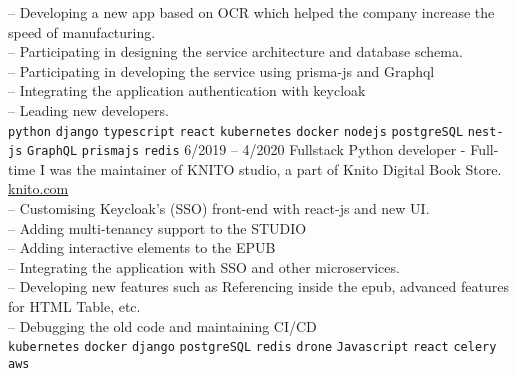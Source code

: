 \begin{entrylist}
{        -- Developing a new app based on OCR which helped
        the company increase the speed of manufacturing. \\
        -- Participating in designing the service architecture and database schema. \\
        -- Participating in developing the service using prisma-js and Graphql \\
        -- Integrating the application authentication with keycloak \\
        -- Leading new developers. \\

        \texttt{python}\slashsep
        \texttt{django}\slashsep
        \texttt{typescript}\slashsep
        \texttt{react}\slashsep
        \texttt{kubernetes}\slashsep
        \texttt{docker}\slashsep
        \texttt{nodejs}\slashsep
        \texttt{postgreSQL}\slashsep
        \texttt{nest-js}\slashsep
        \texttt{GraphQL}\slashsep
        \texttt{prismajs}\slashsep
        \texttt{redis}\slashsep
    }
    \entry
    {6/2019 -- 4/2020}
    {Fullstack Python developer - Full-time}
    {}
    {
        I was the maintainer of KNITO studio, a part of Knito Digital Book Store.
        \href{https://knito.com/}{knito.com} \\
        -- Customising Keycloak's (SSO) front-end with react-js and new UI. \\
        -- Adding multi-tenancy support to the STUDIO \\
        -- Adding interactive elements to the EPUB \\
        -- Integrating the application with SSO and other microservices. \\
        -- Developing new features such as Referencing inside the epub, advanced features for HTML Table, etc. \\
        -- Debugging the old code and maintaining CI/CD \\
        \texttt{kubernetes}\slashsep
        \texttt{docker}\slashsep
        \texttt{django}\slashsep
        \texttt{postgreSQL}\slashsep
        \texttt{redis}\slashsep
        \texttt{drone}\slashsep
        \texttt{Javascript}\slashsep
        \texttt{react}\slashsep
        \texttt{celery}\slashsep
        \texttt{aws}\slashsep
    }


\end{entrylist}
